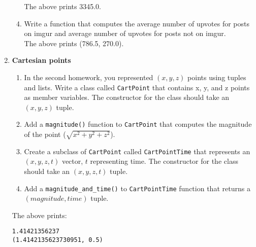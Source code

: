 \documentclass{article}
\newcounter{points}
\begin{document}
\begin{enumerate}
\begin{enumerate}

The above prints 3345.0.

\end{enumerate}

\begin{enumerate}
\setcounter{enumii}{3}
\item Write a function that computes the average number of upvotes for posts on imgur and average number of upvotes for posts not on imgur. \\


The above prints (786.5, 270.0).
\end{enumerate}

\newpage
\item \textbf{Cartesian points}
\begin{enumerate}
\item In the second homework, you represented $(x, y, z)$ points using tuples and lists.  Write a class called \texttt{CartPoint} that contains x, y, and z points as member variables.  The constructor for the class should take an $(x, y, z)$ tuple.
\end{enumerate}

\begin{enumerate}
\setcounter{enumii}{1}
\item Add a \texttt{magnitude()} function to \texttt{CartPoint} that computes the magnitude of the point ($\sqrt{x^2 + y^2 + z^2}$).
\end{enumerate}

\begin{enumerate}
\setcounter{enumii}{2}
\item Create a subclass of \texttt{CartPoint} called \texttt{CartPointTime} that represents an $(x, y, z, t)$ vector, $t$ representing time.  The constructor for the class should take an $(x, y, z, t)$ tuple.
\end{enumerate}

\begin{enumerate}
\setcounter{enumii}{3}
\item Add a \texttt{magnitude\_and\_time()} to \texttt{CartPointTime} function that returns a $(magnitude, time)$ tuple.
\end{enumerate}



The above prints:
\begin{verbatim}
1.41421356237
(1.4142135623730951, 0.5)
\end{verbatim}


\end{enumerate}
\end{document}

